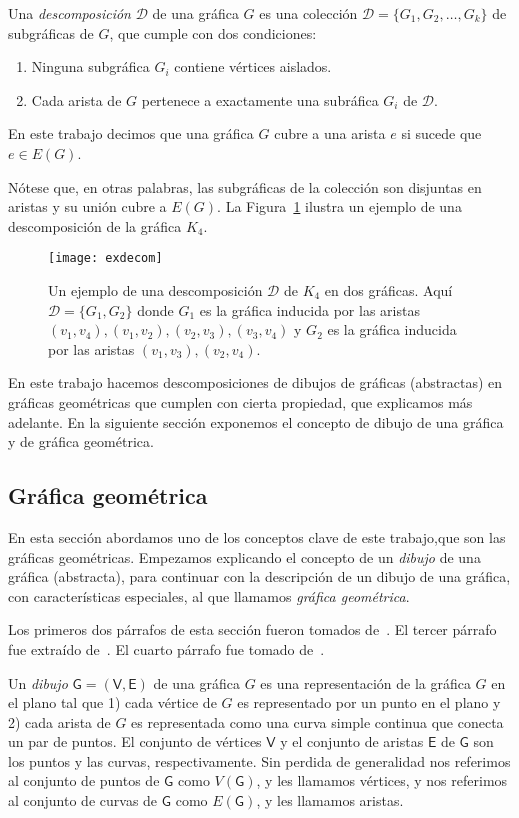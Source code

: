 Una \emph{descomposición} $\mathcal{D}$ de una gráfica $G$ es una colección
$\mathcal{D}=\{G_1,G_2,\dots,G_k\}$ de subgráficas de $G$, que cumple con dos
condiciones:
\begin{enumerate}
  \item Ninguna subgráfica $G_i$ contiene vértices aislados.
  \item Cada arista de $G$ pertenece a exactamente una subráfica $G_i$ de
  $\mathcal{D}$.
\end{enumerate}
En este trabajo decimos que una gráfica $G$ cubre a una arista $e$ si sucede
que $e\in E(G)$.

Nótese que, en otras palabras, las subgráficas de la colección son disjuntas en
aristas y su unión cubre a $E(G)$.
La Figura~\ref{fig:exdecom} ilustra un ejemplo de una descomposición de la
gráfica $K_4$.
\begin{figure}[htbp]
  \centering
  \texttt{[image: exdecom]}
  \caption{Un ejemplo de una descomposición $\mathcal{D}$ de $K_4$ en dos
  gráficas. Aquí $\mathcal{D}=\{G_1,G_2\}$ donde $G_1$ es la gráfica inducida
  por las aristas $(v_1,v_4),(v_1,v_2),(v_2,v_3),(v_3,v_4)$ y
  $G_2$ es la gráfica inducida por las aristas $(v_1,v_3),(v_2,v_4)$.}
  \label{fig:exdecom}
\end{figure}
%
%

En este trabajo hacemos descomposiciones de dibujos de gráficas (abstractas) en
gráficas geométricas que cumplen con cierta propiedad, que explicamos más
adelante. En la siguiente sección exponemos el concepto de dibujo de una
gráfica y de gráfica geométrica.

\subsection{Gráfica geométrica}
En esta sección abordamos uno de los conceptos clave de este trabajo,que son
las gráficas geométricas. Empezamos explicando el concepto de un
\emph{dibujo} de una gráfica (abstracta), para continuar con la descripción
de un dibujo de una gráfica, con características especiales, al que llamamos
\emph{gráfica geométrica}.

Los primeros dos párrafos de esta sección fueron tomados de~\cite{Pach2013}. El
tercer párrafo fue extraído de~\cite{Lara2019}. El cuarto párrafo fue tomado
de~\cite{Pach2011}.

Un \emph{dibujo} $\mathsf{G}=(\mathsf{V},\mathsf{E})$ de una gráfica $G$ es una
representación de la gráfica $G$ en el plano tal que 1) cada vértice de $G$ es
representado por un punto en el plano y 2) cada arista de $G$ es representada
como una curva simple continua que conecta un par de puntos. El conjunto de
vértices $\mathsf{V}$ y el conjunto de aristas $\mathsf{E}$ de $\mathsf{G}$
son los puntos y las curvas, respectivamente. Sin perdida de generalidad nos
referimos al conjunto de puntos de $\mathsf{G}$ como $V(\mathsf{G})$, y les
llamamos vértices, y nos referimos al conjunto de curvas de $\mathsf{G}$ como
$E(\mathsf{G})$, y les llamamos aristas.

